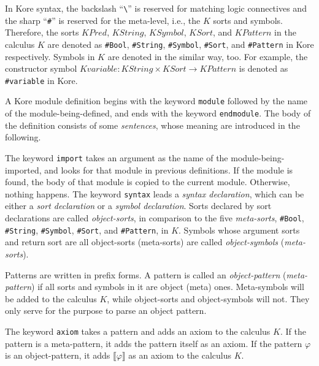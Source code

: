 \documentclass[UTF8,11pt]{article}
\theoremstyle{plain}
\theoremstyle{definition}
\theoremstyle{remark}
\newcommand{\Bracket}[1]
    {\llbracket#1\rrbracket}
\newcommand{\KPred}{\mathit{KPred}}
\newcommand{\KString}{\mathit{KString}}
\newcommand{\KSort}{\mathit{KSort}}
\newcommand{\KSymbol}{\mathit{KSymbol}}
\newcommand{\KPattern}{\mathit{KPattern}}
\newcommand{\Kvariable}{\mathit{Kvariable}}
\begin{document}
In Kore syntax, the backslash ``\verb|\|'' is reserved for matching logic connectives and the sharp ``\verb|#|'' is reserved for the meta-level, i.e., the $K$ sorts and symbols. 
Therefore, the sorts $\KPred$, $\KString$, $\KSymbol$, $\KSort$, and 
$\KPattern$ in the calculus $K$ are denoted as \verb|#Bool|, \verb|#String|, 
\verb|#Symbol|, \verb|#Sort|, and \verb|#Pattern| in Kore respectively.
Symbols in $K$ are denoted in the similar way, too. 
For example, the constructor symbol $\Kvariable \colon \KString \times \KSort \to \KPattern$ is denoted as \verb|#variable| in Kore. 

A Kore module definition begins with the keyword \verb|module| followed by the name of the module-being-defined, and ends with the keyword \verb|endmodule|. The body of the definition consists of some \emph{sentences}, whose meaning are introduced in the following.

The keyword \verb|import| takes an argument as the name of the module-being-imported, and looks for that module in previous definitions. 
If the module is found, the body of that module is copied to the current module.
Otherwise, nothing happens. 
The keyword \verb|syntax| leads a \emph{syntax declaration}, which can be either a \emph{sort declaration} or a \emph{symbol declaration}.
Sorts declared by sort declarations are called \emph{object-sorts}, in comparison to the five \emph{meta-sorts}, \verb|#Bool|, \verb|#String|, \verb|#Symbol|, \verb|#Sort|, and \verb|#Pattern|, in $K$. 
Symbols whose argument sorts and return sort are all object-sorts (meta-sorts) are called \emph{object-symbols} (\emph{meta-sorts}).

Patterns are written in prefix forms. 
A pattern is called an \emph{object-pattern} (\emph{meta-pattern}) if all sorts and symbols in it are object (meta) ones.
Meta-symbols will be added to the calculus $K$, while object-sorts and object-symbols will not.
They only serve for the purpose to parse an object pattern. 

The keyword \verb|axiom| takes a pattern and adds an axiom to the calculus $K$.
If the pattern is a meta-pattern, it adds the pattern itself as an axiom.
If the pattern $\varphi$ is an object-pattern, it adds $\Bracket{\varphi}$ as an axiom to the calculus $K$.
\end{document}
